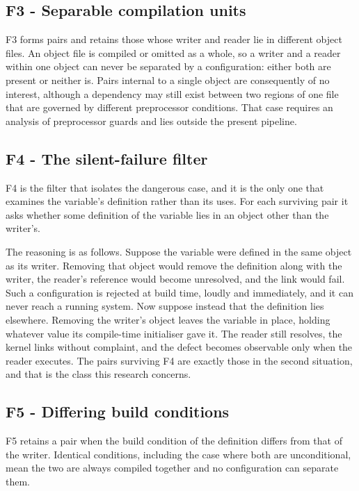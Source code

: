 \documentclass[12pt, a4paper, oneside]{book}
\begin{document}
\subsection{F3 - Separable compilation units}

F3 forms pairs and retains those whose writer and reader lie in different object
files. An object file is compiled or omitted as a whole, so a writer and a reader
within one object can never be separated by a configuration: either both are
present or neither is. Pairs internal to a single object are consequently of no
interest, although a dependency may still exist between two regions of one file
that are governed by different preprocessor conditions. That case requires an
analysis of preprocessor guards and lies outside the present pipeline.

\subsection{F4 - The silent-failure filter}

F4 is the filter that isolates the dangerous case, and it is the only one that
examines the variable's definition rather than its uses. For each surviving pair
it asks whether some definition of the variable lies in an object other than the
writer's.

The reasoning is as follows. Suppose the variable were defined in the same object
as its writer. Removing that object would remove the definition along with the
writer, the reader's reference would become unresolved, and the link would fail.
Such a configuration is rejected at build time, loudly and immediately, and it can
never reach a running system. Now suppose instead that the definition lies
elsewhere. Removing the writer's object leaves the variable in place, holding
whatever value its compile-time initialiser gave it. The reader still resolves,
the kernel links without complaint, and the defect becomes observable only when
the reader executes. The pairs surviving F4 are exactly those in the second
situation, and that is the class this research concerns.

\subsection{F5 - Differing build conditions}

F5 retains a pair when the build condition of the definition differs from that of
the writer. Identical conditions, including the case where both are
unconditional, mean the two are always compiled together and no configuration can
separate them.
\end{document}
